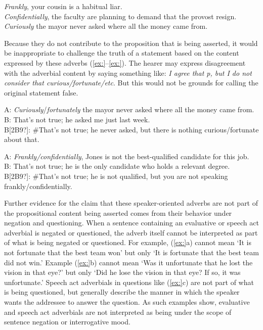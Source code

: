 \ea
\ea \textit{Frankly}, your cousin is a habitual liar.\\
\ex \textit{Confidentially}, the faculty are planning to demand that the provost resign.\\
\ex \textit{Curiously} the mayor never asked where all the money came from.
                       \z
\z


Because they do not contribute to the proposition that is being asserted, it would be inappropriate to challenge the truth of a statement based on the content expressed by these adverbs (\ref{ex:}--\ref{ex:}). The hearer may express disagreement with the adverbial content by saying something like: \textit{I agree that p, but I do not consider that curious/fortunate/etc}. But this would not be grounds for calling the original statement false.


\ea
A: \textit{Curiously}/\textit{fortunately} the mayor never asked where all the money came from.\\
B: That’s not true; he asked me just last week.\\
B[2B9?]: \#That’s not true; he never asked, but there is nothing curious/fortunate about that.
\z

\ea
A: \textit{Frankly/confidentially}, Jones is not the best-qualified candidate for this job.\\
B: That’s not true; he is the only candidate who holds a relevant degree.\\
B[2B9?]: \#That’s not true; he is not qualified, but you are not speaking frankly/confidentially.
\z


Further evidence for the claim that these speaker-oriented adverbs are not part of the propositional content being asserted comes from their behavior under negation and questioning. When a sentence containing an evaluative or speech act adverbial is negated or questioned, the adverb itself cannot be interpreted as part of what is being negated or questioned. For example, (\ref{ex:}a) cannot mean ‘It is not fortunate that the best team won’ but only ‘It is fortunate that the best team did not win.’ Example (\ref{ex:}b) cannot mean ‘Was it unfortunate that he lost the vision in that eye?’ but only ‘Did he lose the vision in that eye? If so, it was unfortunate.’ Speech act adverbials in questions like (\ref{ex:}c) are not part of what is being questioned, but generally describe the manner in which the speaker wants the addressee to answer the question. As such examples show, evaluative and speech act adverbials are not interpreted as being under the scope of sentence negation or interrogative mood.



